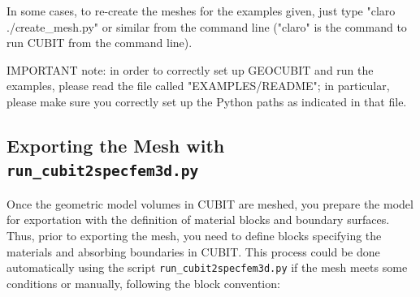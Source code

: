 In some cases, to re-create the meshes for the examples given, just type "claro ./create\_mesh.py" or similar
from the command line ("claro" is the command to run CUBIT from the command line).

IMPORTANT note: in order to correctly set up GEOCUBIT and run the examples, please read the file called "EXAMPLES/README";
in particular, please make sure you correctly set up the Python paths as indicated in that file.


\subsection{Exporting the Mesh with \texttt{run\_cubit2specfem3d.py} }\label{subsec:Exporting-the-Mesh}

Once the geometric model volumes in CUBIT are meshed, you prepare
the model for exportation with the definition of material blocks and
boundary surfaces. Thus, prior to exporting the mesh, you need to
define blocks specifying the materials and absorbing boundaries in
CUBIT. This process could be done automatically using the script \texttt{run\_cubit2specfem3d.py}
if the mesh meets some conditions or manually, following the block
convention:
